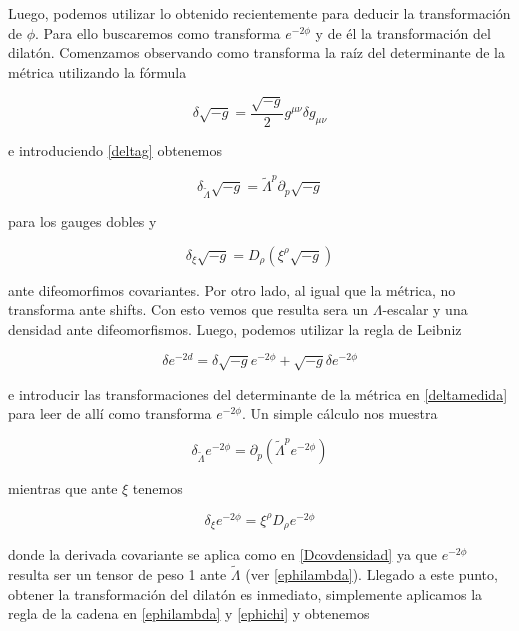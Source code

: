 \documentclass{article}
\numberwithin{equation}{section}
\begin{document}
\vspace{.5cm}

Luego, podemos utilizar lo obtenido recientemente para deducir la transformación de $ \phi $. Para ello buscaremos como transforma $ e^{-2\phi} $ y de él la transformación del dilatón. Comenzamos observando como transforma la raíz del determinante de la métrica utilizando la fórmula

\begin{equation}
\delta \sqrt{-g} = \frac{\sqrt{-g}}{2} g^{\mu \nu} \delta g_{\mu \nu}
\end{equation}

e introduciendo \ref{deltag} obtenemos

\begin{equation}\label{determinantelambda}
\delta_{\widetilde{\Lambda}} \sqrt{-g} = \widetilde{\Lambda}^p \partial_p \sqrt{-g} 
\end{equation}

para los gauges dobles y

\begin{equation}
\delta_{\xi} \sqrt{-g} = D_{\rho} \left( \xi^{\rho} \sqrt{-g} \right) 
\end{equation}

ante difeomorfimos covariantes. Por otro lado, al igual que la métrica, no transforma ante shifts. Con esto vemos que resulta sera un $ \Lambda$-escalar y una densidad ante difeomorfismos. Luego, podemos utilizar la regla de Leibniz 

\begin{equation}\label{medidaauxiliar2}
\delta e^{-2 d} = \delta \sqrt{-g} e^{-2 \phi} + \sqrt{-g} \delta e^{-2 \phi}
\end{equation}

e introducir las transformaciones del determinante de la métrica en \ref{deltamedida} para leer de allí como transforma $ e^{-2 \phi} $. Un simple cálculo nos muestra

\begin{equation}\label{ephilambda}
\delta_{\widetilde{\Lambda}} e^{-2 \phi} = \partial_p \left( \widetilde{\Lambda}^p e^{-2 \phi}\right)
\end{equation}

mientras que ante $ \xi $ tenemos

\begin{equation}\label{ephichi}
\delta_{\xi} e^{-2 \phi} = \xi^{\rho} D_{\rho} e^{-2 \phi}
\end{equation}

donde la derivada covariante se aplica como en \ref{Dcovdensidad} ya que $ e^{-2\phi} $ resulta ser un tensor de peso 1 ante $ \widetilde{\Lambda} $ (ver \ref{ephilambda}). Llegado a este punto, obtener la transformación del dilatón es inmediato, simplemente aplicamos la regla de la cadena en \ref{ephilambda} y \ref{ephichi} y obtenemos
\end{document}
